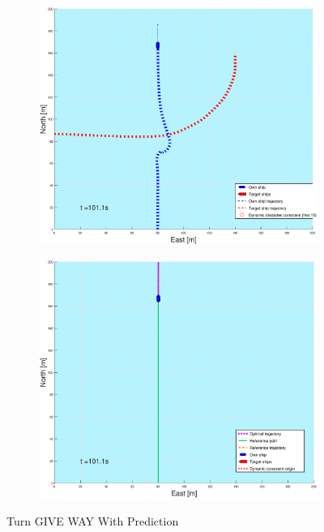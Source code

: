 \begin{figure}[ht]
\begin{subfigure}[b]{0.499\textwidth}
    \end{subfigure}
    \hfill
    \\
    \begin{subfigure}[b]{0.49\textwidth}
        \centering
        \includegraphics[width=\textwidth]{Images/Figures/sving_GW/_Simple_0fig1_time=101}
    \end{subfigure}
    \hfill
    \begin{subfigure}[b]{0.499\textwidth}
        \centering
        \includegraphics[width=\textwidth]{Images/Figures/sving_GW/_Simple_0fig999_time=101}
    \end{subfigure}
    \hfill
    \caption{Turn GIVE WAY With Prediction}
\end{figure}

